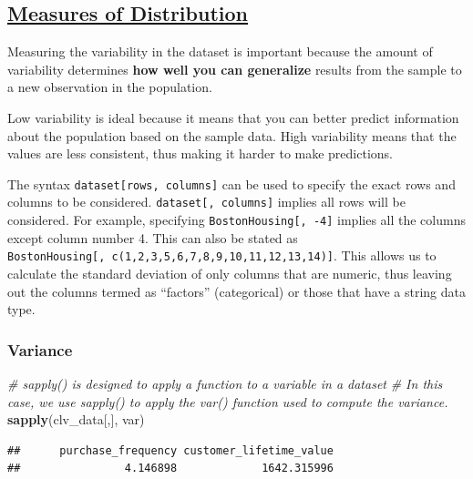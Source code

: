 \documentclass[
]{article}
\newenvironment{Shaded}{\begin{snugshade}}{\end{snugshade}}
\newcommand{\CommentTok}[1]{\textcolor[rgb]{0.56,0.35,0.01}{\textit{#1}}}
\newcommand{\FunctionTok}[1]{\textcolor[rgb]{0.13,0.29,0.53}{\textbf{#1}}}
\newcommand{\NormalTok}[1]{#1}
\begin{document}
\subsection{\texorpdfstring{\ul{\textbf{Measures of
Distribution}}}{Measures of Distribution}}\label{measures-of-distribution}

Measuring the variability in the dataset is important because the amount
of variability determines \textbf{how well you can generalize} results
from the sample to a new observation in the population.

Low variability is ideal because it means that you can better predict
information about the population based on the sample data. High
variability means that the values are less consistent, thus making it
harder to make predictions.

The syntax \texttt{dataset{[}rows,\ columns{]}} can be used to specify
the exact rows and columns to be considered.
\texttt{dataset{[},\ columns{]}} implies all rows will be considered.
For example, specifying \texttt{BostonHousing{[},\ -4{]}} implies all
the columns except column number 4. This can also be stated as
\texttt{BostonHousing{[},\ c(1,2,3,5,6,7,8,9,10,11,12,13,14){]}}. This
allows us to calculate the standard deviation of only columns that are
numeric, thus leaving out the columns termed as ``factors''
(categorical) or those that have a string data type.

\subsubsection{\texorpdfstring{\textbf{Variance}}{Variance}}\label{variance}

\begin{Shaded}
\begin{Highlighting}[]
\CommentTok{\# \textasciigrave{}sapply()\textasciigrave{} is designed to apply a function to a variable in a dataset}
\CommentTok{\# In this case, we use \textasciigrave{}sapply()\textasciigrave{} to apply the \textasciigrave{}var()\textasciigrave{} function used to compute the variance.}
\FunctionTok{sapply}\NormalTok{(clv\_data[,], var)}
\end{Highlighting}
\end{Shaded}

\begin{verbatim}
##      purchase_frequency customer_lifetime_value 
##                4.146898             1642.315996
\end{verbatim}
\end{document}

